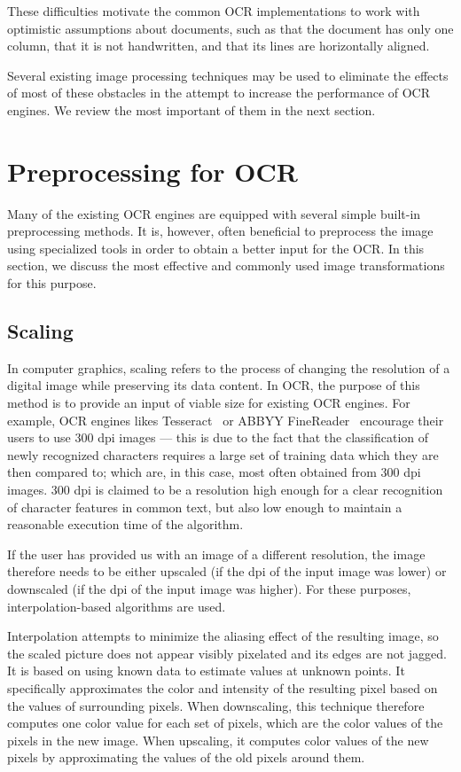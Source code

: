 These difficulties motivate the common OCR implementations to work with optimistic assumptions about documents, such as that the document has only one column, that it is not handwritten, and that its lines are horizontally aligned.

Several existing image processing techniques may be used to eliminate the effects of most of these obstacles in the attempt to increase the performance of OCR engines. We review the most important of them in the next section.

\section{Preprocessing for OCR}

Many of the existing OCR engines are equipped with several simple built-in preprocessing methods. It is, however, often beneficial to preprocess the image using specialized tools in order to obtain a better input for the OCR. In this section, we discuss the most effective and commonly used image transformations for this purpose.

\subsection{Scaling} \label{scaling}

In computer graphics, scaling refers to the process of changing the resolution of a digital image while preserving its data content. In OCR, the purpose of this method is to provide an input of viable size for existing OCR engines. For example, OCR engines likes Tesseract~\cite{TesseractQual} or ABBYY FineReader~\cite{ABBYYdpi} encourage their users to use 300 dpi images --- this is due to the fact that the classification of newly recognized characters requires a large set of training data which they are then compared to; which are, in this case, most often obtained from 300 dpi images. 300 dpi is claimed to be a resolution high enough for a clear recognition of character features in common text, but also low enough to maintain a reasonable execution time of the algorithm.

If the user has provided us with an image of a different resolution, the image therefore needs to be either upscaled (if the dpi of the input image was lower) or downscaled (if the dpi of the input image was higher). For these purposes, interpolation-based algorithms are used.

Interpolation attempts to minimize the aliasing effect of the resulting image, so the scaled picture does not appear visibly pixelated and its edges are not jagged. It is based on using known data to estimate values at unknown points. It specifically approximates the color and intensity of the resulting pixel based on the values of surrounding pixels. When downscaling, this technique therefore computes one color value for each set of pixels, which are the color values of the pixels in the new image. When upscaling, it computes color values of the new pixels by approximating the values of the old pixels around them.

